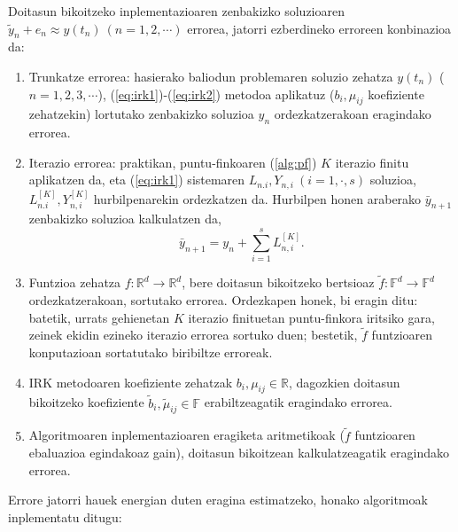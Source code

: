 Doitasun bikoitzeko inplementazioaren zenbakizko soluzioaren $\tilde{y}_n+e_n \approx y(t_n) \ (n=1,2,\cdots)$ errorea, jatorri ezberdineko erroreen konbinazioa da:
\begin{enumerate}
\item Trunkatze errorea: hasierako baliodun problemaren soluzio zehatza $y(t_n)$ ($n=1,2,3,\cdots$), (\ref{eq:irk1})-(\ref{eq:irk2}) metodoa aplikatuz  ($b_i,\mu_{ij}$ koefiziente zehatzekin) lortutako zenbakizko soluzioa $y_n$ ordezkatzerakoan eragindako errorea. 
\item Iterazio errorea: praktikan, puntu-finkoaren (\ref{alg:pf}) $K$ iterazio finitu aplikatzen da, eta (\ref{eq:irk1}) sistemaren $L_{n.i}, Y_{n,i} \ (i=1,\cdot,s)$ soluzioa, $L_{n.i}^{[K]}, Y_{n,i}^{[K]}$ hurbilpenarekin ordezkatzen da. Hurbilpen honen araberako $\bar{y}_{n+1}$ zenbakizko soluzioa kalkulatzen da,
\begin{equation*}
\bar{y}_{n+1}=y_{n}+\sum_{i=1}^{s} L_{n,i}^{[K]}.
\end{equation*}   
\item Funtzioa zehatza $f:\mathbb{R}^d \rightarrow \mathbb{R}^d$, bere doitasun bikoitzeko bertsioaz $\tilde{f}:\mathbb{F}^d \rightarrow \mathbb{F}^d$ ordezkatzerakoan, sortutako errorea.  Ordezkapen honek, bi eragin ditu: batetik, urrats gehienetan $K$ iterazio finituetan puntu-finkora iritsiko gara, zeinek  ekidin ezineko iterazio errorea sortuko duen; bestetik, $\tilde{f}$ funtzioaren konputazioan sortatutako biribiltze erroreak. 
\item IRK metodoaren koefiziente zehatzak $b_i,\mu_{ij} \in \mathbb{R}$, dagozkien doitasun bikoitzeko koefiziente $\tilde{b}_i,\tilde{\mu}_{ij} \in \mathbb{F}$ erabiltzeagatik eragindako errorea.
\item Algoritmoaren inplementazioaren eragiketa aritmetikoak ($\tilde{f}$ funtzioaren ebaluazioa egindakoaz gain), doitasun bikoitzean kalkulatzeagatik eragindako errorea.  
\end{enumerate} 

Errore jatorri hauek energian duten eragina estimatzeko, honako algoritmoak inplementatu ditugu:

